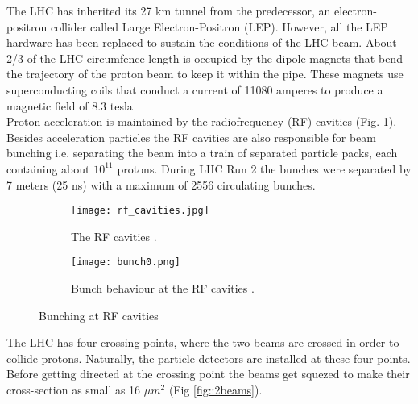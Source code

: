      The LHC has inherited its 27 km tunnel from the predecessor, an electron-positron collider called Large Electron-Positron (LEP). However, all the LEP hardware has been replaced to sustain the conditions of the LHC beam. About 2/3 of the LHC circumfence length is occupied by the dipole magnets that bend the trajectory of the proton beam to keep it within the pipe. These magnets use superconducting coils that conduct a current of 11080 amperes to produce a magnetic field of 8.3 tesla \\
     Proton acceleration is maintained by the radiofrequency (RF) cavities (Fig. \ref{fig::rf_cavities}). Besides acceleration particles the RF cavities are also responsible for beam bunching i.e. separating the beam into a train of separated particle packs, each containing about $10^{11}$ protons. During LHC Run 2 the bunches were separated by 7 meters (25 ns) with a maximum of 2556 circulating bunches.
	\begin{figure}[htbp]
	\begin{subfigure}[t]{0.48\textwidth}
		\texttt{[image: rf\_cavities.jpg]}
		\caption[RF Cavities]{The RF cavities \cite{rf_cavities}.}
		\label{fig::rf_cavities}
	\end{subfigure}
	\hfill
	\begin{subfigure}[t]{0.48\textwidth}
		\texttt{[image: bunch0.png]}
		\caption[Beam pipes]{Bunch behaviour at the RF cavities \cite{Wilson:513326}.}
		\label{fig::bunching}
	\end{subfigure}
	\caption{Bunching at RF cavities}
	\label{fig::bunch_at_rf}
\end{figure}
	The LHC has four crossing points, where the two beams are crossed in order to collide protons. Naturally, the particle detectors are installed at these four points. Before getting directed at the crossing point the beams get squezed to make their cross-section as small as 16 $\mu m^2$ (Fig \ref{fig::2beams}).  	

